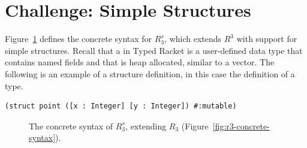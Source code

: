 \documentclass[11pt]{book}
\newcommand{\gray}[1]{{\color{gray} #1}}
\begin{document}
\section{Challenge: Simple Structures}
\label{sec:simple-structures}

Figure~\ref{fig:r3s-concrete-syntax} defines the concrete syntax for
$R^s_3$, which extends $R^3$ with support for simple structures.
Recall that a  in Typed Racket is a user-defined data
type that contains named fields and that is heap allocated, similar to
a vector. The following is an example of a structure definition, in
this case the definition of a  type.
\begin{lstlisting}
(struct point ([x : Integer] [y : Integer]) #:mutable)
\end{lstlisting}

\begin{figure}[tbp]
\centering
\fbox{
\begin{minipage}{0.96\textwidth}
\[
\begin{array}{lcl}
  \Type &::=& \gray{\key{Integer} \mid \key{Boolean}
  \mid (\key{Vector}\;\Type \ldots) \mid \key{Void} } \mid \Var \\
  \itm{cmp} &::= & \gray{ \key{eq?} \mid \key{<} \mid \key{<=} \mid \key{>} \mid \key{>=} } \\
  \Exp &::=& \gray{  \Int \mid (\key{read}) \mid (\key{-}\;\Exp) \mid (\key{+} \; \Exp\;\Exp) \mid (\key{-}\;\Exp\;\Exp) }  \\
  &\mid&  \gray{  \Var \mid (\key{let}~([\Var~\Exp])~\Exp)  }\\
  &\mid& \gray{ \key{\#t} \mid \key{\#f} 
   \mid (\key{and}\;\Exp\;\Exp) 
   \mid (\key{or}\;\Exp\;\Exp)
   \mid (\key{not}\;\Exp) } \\
  &\mid& \gray{  (\itm{cmp}\;\Exp\;\Exp) 
   \mid (\key{if}~\Exp~\Exp~\Exp)  } \\
  &\mid& \gray{ (\key{vector}\;\Exp \ldots) 
   \mid (\key{vector-ref}\;\Exp\;\Int) } \\
  &\mid& \gray{ (\key{vector-set!}\;\Exp\;\Int\;\Exp) }\\
  &\mid& \gray{ (\key{void}) } \mid (\Var\;\Exp \ldots)\\
  \Def &::=& (\key{struct}\; \Var \; ([\Var \,\key{:}\, \Type] \ldots)\; \code{\#:mutable})\\
  R_3 &::=& \Def \ldots \; \Exp
\end{array}
\]
\end{minipage}
}
\caption{The concrete syntax of $R^s_3$, extending $R_3$
  (Figure~\ref{fig:r3-concrete-syntax}).}
\label{fig:r3s-concrete-syntax}
\end{figure}
\end{document}

